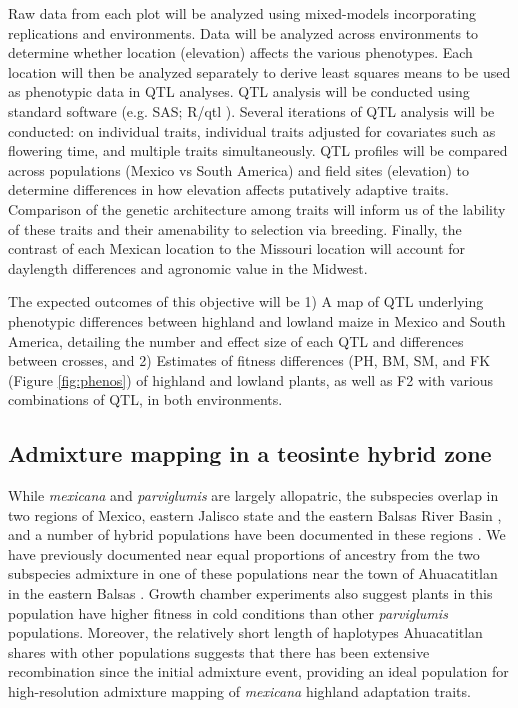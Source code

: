 Raw data from each plot will be analyzed using mixed-models incorporating replications and environments.  Data will be analyzed across environments to determine whether location (elevation) affects the various phenotypes.  Each location will then be analyzed separately to derive least squares means to be used as  phenotypic data in QTL analyses.  QTL analysis will be conducted using standard software (e.g. SAS; R/qtl \citealp{Broman2003a}).  Several iterations of QTL analysis will be conducted: on individual traits, individual traits adjusted for covariates such as flowering time, and multiple traits simultaneously.   QTL profiles will be compared across populations (Mexico vs South America) and field sites (elevation) to determine differences in how elevation affects putatively adaptive traits.  Comparison of the genetic architecture among traits will inform us of the lability of these traits and their amenability to selection via breeding.  Finally, the contrast of each Mexican location to the Missouri location will account for daylength differences and agronomic value in the Midwest. 

The expected outcomes of this objective will be 1) A map of QTL underlying phenotypic differences between highland and lowland maize in Mexico and South America, detailing the number and effect size of each QTL and differences between crosses, and 2) Estimates of fitness differences (PH, BM, SM, and FK (Figure \ref{fig:phenos}) of highland and lowland plants, as well as F2 with various combinations of QTL, in both environments. 

\subsection{Admixture mapping in a teosinte hybrid zone} \label{subsec:admixmap}
While \emph{mexicana} and \emph{parviglumis} are largely allopatric, the subspecies overlap in two regions of Mexico, eastern Jalisco state and the eastern Balsas River Basin \citep{hufford2012inferences}, and a number of hybrid populations have been documented in these regions \citep{Fukunaga2005}.  We have previously documented near equal proportions of ancestry from the two subspecies   admixture in one of these populations near the town of Ahuacatitlan in the eastern Balsas \citep{Pyhajarvi2013}.  Growth chamber experiments also suggest plants in this population have higher fitness in cold conditions than other \emph{parviglumis} populations.  Moreover, the relatively short length of  haplotypes Ahuacatitlan shares with other  populations suggests that there has been extensive recombination since the initial admixture event, providing an ideal population for high-resolution admixture mapping of \emph{mexicana} highland adaptation traits.


